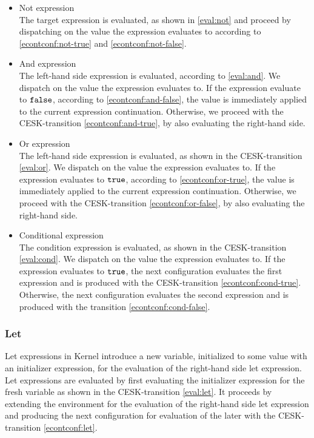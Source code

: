\documentclass[a4paper,oneside]{article}
\begin{document}
\begin{itemize}
    \item Not expression\\
        The target expression is evaluated, as shown in \eqref{eval:not} and proceed by dispatching on the value the expression evaluates to according to \eqref{econtconf:not-true} and \eqref{econtconf:not-false}.

    \item And expression\\
        The left-hand side expression is evaluated, according to \eqref{eval:and}.
        We dispatch on the value the expression evaluates to.
        If the expression evaluate to $\tt{false}$, according to \eqref{econtconf:and-false}, the value is immediately applied to the current expression continuation.
        Otherwise, we proceed with the CESK-transition \eqref{econtconf:and-true}, by also evaluating the right-hand side.

    \item Or expression\\
        The left-hand side expression is evaluated, as shown in the CESK-transition \eqref{eval:or}.
        We dispatch on the value the expression evaluates to.
        If the expression evaluates to $\tt{true}$, according to \eqref{econtconf:or-true}, the value is immediately applied to the current expression continuation.
        Otherwise, we proceed with the CESK-transition \eqref{econtconf:or-false}, by also evaluating the right-hand side.

    \item Conditional expression\\
        The condition expression is evaluated, as shown in the CESK-transition \eqref{eval:cond}.
        We dispatch on the value the expression evaluates to.
        If the expression evaluates to $\tt{true}$, the next configuration evaluates the first expression and is produced with the CESK-transition \eqref{econtconf:cond-true}.
        Otherwise, the next configuration evaluates the second expression and is produced with the transition \eqref{econtconf:cond-false}.

\end{itemize}


\subsubsection{Let}

Let expressions in Kernel introduce a new variable, initialized to some value with an initializer expression, for the evaluation of the right-hand side let expression.
Let expressions are evaluated by first evaluating the initializer expression for the fresh variable as shown in the CESK-transition \eqref{eval:let}.
It proceeds by extending the environment for the evaluation of the right-hand side let expression and producing the next configuration for evaluation of the later with the CESK-transition \eqref{econtconf:let}.
\end{document}
